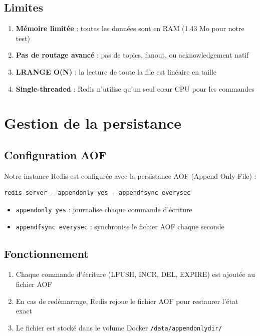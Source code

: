 \documentclass[12pt,a4paper]{article}
\begin{document}
\subsection{Limites}

\begin{enumerate}
    \item \textbf{M\'emoire limit\'ee} : toutes les donn\'ees sont en RAM (1.43 Mo pour notre test)
    \item \textbf{Pas de routage avanc\'e} : pas de topics, fanout, ou acknowledgement natif
    \item \textbf{LRANGE O(N)} : la lecture de toute la file est lin\'eaire en taille
    \item \textbf{Single-threaded} : Redis n'utilise qu'un seul c\oe ur CPU pour les commandes
\end{enumerate}

\section{Gestion de la persistance}

\subsection{Configuration AOF}

Notre instance Redis est configur\'ee avec la persistance AOF (Append Only File) :

\begin{lstlisting}
redis-server --appendonly yes --appendfsync everysec
\end{lstlisting}

\begin{itemize}
    \item \texttt{appendonly yes} : journalise chaque commande d'\'ecriture
    \item \texttt{appendfsync everysec} : synchronise le fichier AOF chaque seconde
\end{itemize}

\subsection{Fonctionnement}

\begin{enumerate}
    \item Chaque commande d'\'ecriture (LPUSH, INCR, DEL, EXPIRE) est ajout\'ee au fichier AOF
    \item En cas de red\'emarrage, Redis rejoue le fichier AOF pour restaurer l'\'etat exact
    \item Le fichier est stock\'e dans le volume Docker \texttt{/data/appendonlydir/}
\end{enumerate}
\end{document}
